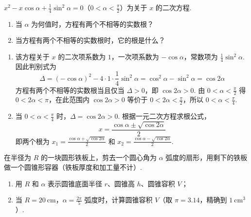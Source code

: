 \begin{problem}
\(x^2-x\cos \alpha+\frac{1}{4}\sin^2 \alpha=0\)（\(0<\alpha<\frac{\pi}{2}\)）为关于 \(x\) 的二次方程.

\begin{enumerate}
\item 当 \(\alpha\) 为何值时，方程有两个不相等的实数根？
\item 当方程有两个不相等的实数根时，它的根是什么？
\end{enumerate}
\end{problem}

\begin{solution}
\begin{enumerate}
\item 该方程关于 \(x\) 的二次项系数为 \(1\)，一次项系数为 \(-\cos\alpha\)，常数项为 \(\frac14\sin^2\alpha\). 因此判别式为
\[
\Delta=(-\cos\alpha)^2-4\cdot1\cdot\frac14\sin^2\alpha=\cos^2\alpha-\sin^2\alpha=\cos 2\alpha
\]
方程有两个不相等的实数根当且仅当 \(\Delta>0\)，即 \(\cos 2\alpha>0\). 由 \(0<\alpha<\frac\pi2\) 得 \(0<2\alpha<\pi\)，在此范围内 \(\cos 2\alpha>0\) 等价于 \(0<2\alpha<\frac\pi2\)，所以 \(0<\alpha<\frac\pi4\).
\item 当 \(0<\alpha<\frac\pi4\) 时，\(\Delta=\cos 2\alpha>0\). 根据一元二次方程求根公式，
\[
x=\frac{\cos\alpha\pm\sqrt{\cos 2\alpha}}{2}
\]
即两个根为 \(x_1=\frac{\cos\alpha+\sqrt{\cos 2\alpha}}{2}\) 和 \(x_2=\frac{\cos\alpha-\sqrt{\cos 2\alpha}}{2}\).
\end{enumerate}
\end{solution}

\begin{problem}
在半径为 \(R\) 的一块圆形铁板上，剪去一个圆心角为 \(\alpha\) 弧度的扇形，用剩下的铁板做一个圆锥形容器（铁板厚度和加工量不计）.

\begin{enumerate}
\item 用 \(R\) 和 \(\alpha\) 表示圆锥底面半径 \(r\)、圆锥高 \(h\)、圆锥容积 \(V\)；
\item 当 \(R=20\mathrm{~cm}\)，\(\alpha=\frac{2\pi}{5}\) 弧度时，计算圆锥容积 \(V\)（取 \(\pi=3.14\)，精确到 \(1\mathrm{~cm^3}\)）.
\end{enumerate}
\end{problem}


